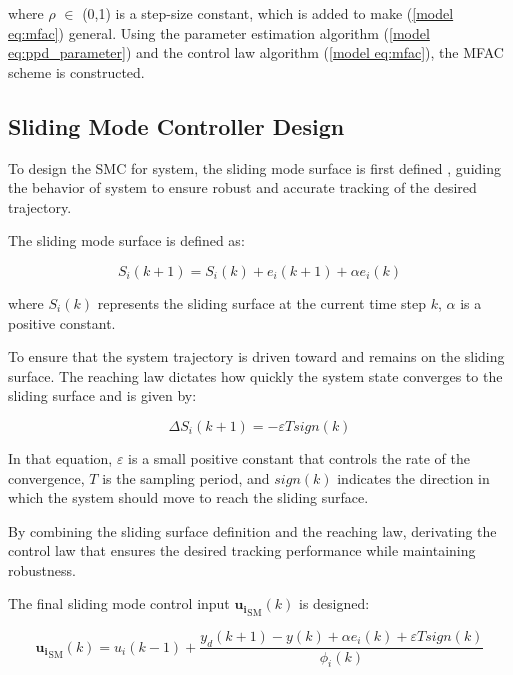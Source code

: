 \documentclass[journal,onecolumn]{IEEEtran}
\begin{document}
where \(\rho\) \(\in\) (0,1) is a step-size constant, which is added to make (\ref{model eq:mfac}) general. Using the parameter estimation algorithm (\ref{model eq:ppd_parameter}) and the control law algorithm (\ref{model eq:mfac}), the MFAC scheme is constructed. 


\subsection{Sliding Mode Controller Design}







To design the SMC for system, the sliding mode surface is first defined , guiding the behavior of system to ensure robust and accurate tracking of the desired trajectory.

The sliding mode surface is defined as:

\begin{equation}
    \label{model eq:sms}
    S_i(k+1) = S_i(k)+e_i(k+1)+\alpha e_i(k) 
\end{equation}

where \(S_i(k)\) represents the sliding surface at the current time step \(k\), \(\alpha\) is a positive constant.

To ensure that the system trajectory is driven toward and remains on the sliding surface. The reaching law dictates how quickly the system state converges to the sliding surface and is given by:

\begin{equation}
    \label{model eq:reaching_law}
    \Delta S_i(k+1) = - \varepsilon T sign(k) 
\end{equation}

In that equation, \(\varepsilon\) is a small positive constant that controls the rate of the convergence, \(T\) is the sampling period, and \(sign(k)\) indicates the direction in which the system should move to reach the sliding surface.

By combining the sliding surface definition and the reaching law, derivating the control law that ensures the desired tracking performance while maintaining robustness.

The final sliding mode control input \(\mathbf{u_i}_{\text{SM}}(k)\) is designed:

\begin{equation}
    \label{model eq:smc}
    \mathbf{u_i}_{\text{SM}}(k) = u_i(k-1) + \frac{y_d(k+1)-y(k) + \alpha e_i(k) + \varepsilon T sign(k)}{\phi_i(k)}
\end{equation}
\end{document}
